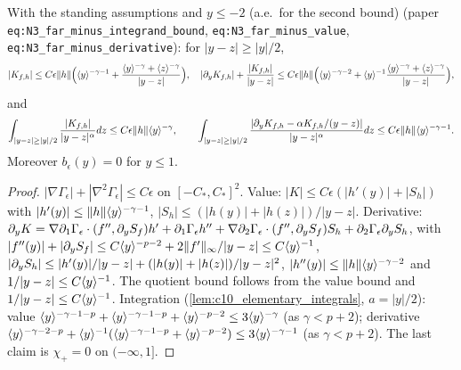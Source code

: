 \begin{lemma}
  \label{lem:c10_N3_far_minus}
  With the standing assumptions and $y\le-2$ (a.e.\ for the second bound)
  (paper \texttt{eq:N3\_far\_minus\_integrand\_bound}, \texttt{eq:N3\_far\_minus\_value},
  \texttt{eq:N3\_far\_minus\_derivative}): for $|y-z|\ge|y|/2$,
  \[
    |K_{f,h}|\le C\epsilon\|h\|\Bigl(\langle y \rangle^{-\gamma-1}+\frac{\langle y \rangle^{-\gamma}+\langle z \rangle^{-\gamma}}{|y-z|}\Bigr),\quad
    |\partial_yK_{f,h}|+\frac{|K_{f,h}|}{|y-z|}\le C\epsilon\|h\|\Bigl(\langle y \rangle^{-\gamma-2}+\langle y \rangle^{-1}\frac{\langle y \rangle^{-\gamma}+\langle z \rangle^{-\gamma}}{|y-z|}\Bigr),
  \]
  and
  \[
    \int_{|y-z|\ge|y|/2}\frac{|K_{f,h}|}{|y-z|^\alpha}dz\le C\epsilon\|h\|\langle y \rangle^{-\gamma},\qquad
    \int_{|y-z|\ge|y|/2}\frac{|\partial_yK_{f,h}-\alpha K_{f,h}/(y-z)|}{|y-z|^\alpha}dz\le C\epsilon\|h\|\langle y \rangle^{-\gamma-1}.
  \]
  Moreover $b_\epsilon(y)=0$ for $y\le1$.
\end{lemma}
\begin{proof}
  $|\nabla\Gamma_\epsilon|+|\nabla^2\Gamma_\epsilon|\le C\epsilon$ on $[-C_*,C_*]^2$. Value:
  $|K|\le C\epsilon(|h'(y)|+|S_h|)$ with $|h'(y)|\le\|h\|\langle y \rangle^{-\gamma-1}$,
  $|S_h|\le(|h(y)|+|h(z)|)/|y-z|$. Derivative: $\partial_yK=\nabla\partial_1\Gamma_\epsilon\cdot(f'',\partial_yS_f)h'
  +\partial_1\Gamma_\epsilon h''+\nabla\partial_2\Gamma_\epsilon\cdot(f'',\partial_yS_f)S_h+\partial_2\Gamma_\epsilon\partial_yS_h$, with
  $|f''(y)|+|\partial_yS_f|\le C\langle y \rangle^{-p-2}+2\|f'\|_\infty/|y-z|\le C\langle y \rangle^{-1}$,
  $|\partial_yS_h|\le|h'(y)|/|y-z|+(|h(y)|+|h(z)|)/|y-z|^2$, $|h''(y)|\le\|h\|\langle y \rangle^{-\gamma-2}$ and
  $1/|y-z|\le C\langle y \rangle^{-1}$. The quotient bound follows from the value bound and $1/|y-z|\le C\langle y \rangle^{-1}$.
  Integration (\cref{lem:c10_elementary_integrals}, $a=|y|/2$): value
  $\langle y \rangle^{-\gamma-1-p}+\langle y \rangle^{-\gamma-1-p}+\langle y \rangle^{-p-2}\le3\langle y \rangle^{-\gamma}$ (as $\gamma<p+2$);
  derivative $\langle y \rangle^{-\gamma-2-p}+\langle y \rangle^{-1}(\langle y \rangle^{-\gamma-1-p}+\langle y \rangle^{-p-2})\le3\langle y \rangle^{-\gamma-1}$
  (as $\gamma<p+2$). The last claim is $\chi_+=0$ on $(-\infty,1]$.
\end{proof}

